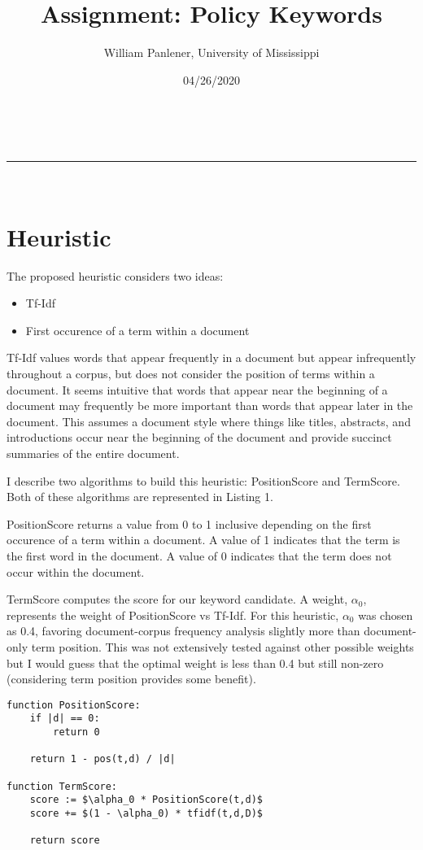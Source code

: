 \documentclass[a4paper,11pt]{article}
\makeatletter
\newcommand{\linia}{\rule{\linewidth}{0.5pt}}
\theoremstyle{mytheor}
\renewcommand{\maketitle}{
\begin{center}
\vspace{2ex}
{\huge \textsc{\@title}}
\vspace{1ex}
\\
\linia\\
\@author \hfill \@date
\vspace{4ex}
\end{center}
}
\makeatother
\begin{document}
\title{Assignment: Policy Keywords}

\author{William Panlener, University of Mississippi}

\date{04/26/2020}

\maketitle

\section*{Heuristic}

The proposed heuristic considers two ideas:
\begin{itemize}
  \item Tf-Idf
  \item First occurence of a term within a document
\end{itemize}

Tf-Idf values words that appear frequently in a document but appear infrequently throughout a corpus, but does not consider the position of terms within a document. It seems intuitive that words that appear near the beginning of a document may frequently be more important than words that appear later in the document. This assumes a document style where things like titles, abstracts, and introductions occur near the beginning of the document and provide succinct summaries of the entire document.

I describe two algorithms to build this heuristic: PositionScore and TermScore. Both of these algorithms are represented in Listing 1.

PositionScore returns a value from 0 to 1 inclusive depending on the first occurence of a term within a document. A value of 1 indicates that the term is the first word in the document. A value of 0 indicates that the term does not occur within the document.

TermScore computes the score for our keyword candidate. A weight, $\alpha_0$, represents the weight of PositionScore vs Tf-Idf. For this heuristic, $\alpha_0$ was chosen as 0.4, favoring document-corpus frequency analysis slightly more than document-only term position. This was not extensively tested against other possible weights but I would guess that the optimal weight is less than 0.4 but still non-zero (considering term position provides some benefit).

\begin{lstlisting}[label={list:first},caption=Term ranking,mathescape=true]
function PositionScore:
	if |d| == 0:
		return 0

	return 1 - pos(t,d) / |d|

function TermScore:
	score := $\alpha_0 * PositionScore(t,d)$
	score += $(1 - \alpha_0) * tfidf(t,d,D)$

	return score
\end{lstlisting}
\end{document}
